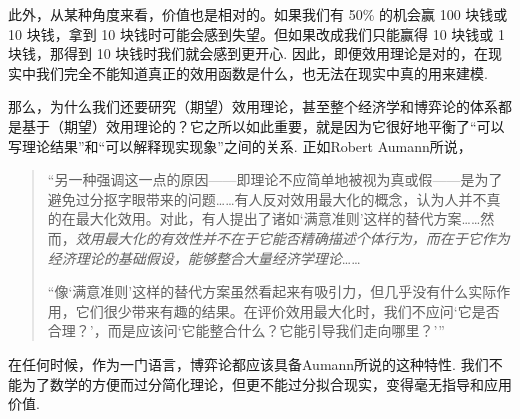 此外，从某种角度来看，价值也是相对的。如果我们有 50\% 的机会赢 100 块钱或 10 块钱，拿到 10 块钱时可能会感到失望。但如果改成我们只能赢得 10 块钱或 1 块钱，那得到 10 块钱时我们就会感到更开心. 因此，即便效用理论是对的，在现实中我们完全不能知道真正的效用函数是什么，也无法在现实中真的用来建模.

那么，为什么我们还要研究（期望）效用理论，甚至整个经济学和博弈论的体系都是基于（期望）效用理论的？它之所以如此重要，就是因为它很好地平衡了“可以写理论结果”和“可以解释现实现象”之间的关系. 正如Robert Aumann所说，

\begin{quotation}
    “另一种强调这一点的原因——即理论不应简单地被视为真或假——是为了避免过分抠字眼带来的问题……有人反对效用最大化的概念，认为人并不真的在最大化效用。对此，有人提出了诸如‘满意准则’这样的替代方案……然而，\emph{效用最大化的有效性并不在于它能否精确描述个体行为，而在于它作为经济理论的基础假设，能够整合大量经济学理论}……

    “像‘满意准则’这样的替代方案虽然看起来有吸引力，但几乎没有什么实际作用，它们很少带来有趣的结果。在评价效用最大化时，我们不应问‘它是否合理？’，而是应该问‘它能整合什么？它能引导我们走向哪里？’”
\end{quotation}

在任何时候，作为一门语言，博弈论都应该具备Aumann所说的这种特性. 我们不能为了数学的方便而过分简化理论，但更不能过分拟合现实，变得毫无指导和应用价值.

